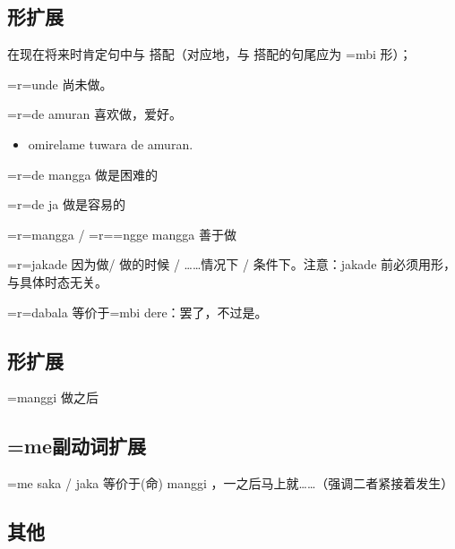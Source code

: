\subsection{形扩展}

在现在将来时肯定句中与  搭配（对应地，与  搭配的句尾应为 =mbi 形）；

\begin{des}
    \item[\V=r=\AIfina unde] 尚未做。
    \item[\V=r=\AIfina de amuran] 喜欢做\V ，爱好。
    \begin{itemize}
        \item {}  omirelame  tuwara de amuran.
    \end{itemize} 
    \item[\V=r=\AIfina de mangga] 做\V 是困难的
    \item[\V=r=\AIfina de ja]做\V 是容易的
    \item[\V=r=\AIfina mangga / \V=r=\AImedi=ngge mangga] 善于做\V  
    \item[\V=r=\AIfina jakade] 因为做\V / 做\V 的时候 / ……情况下 / 条件下。注意：jakade 前必须用形，与具体时态无关。
    \item[\V=r=\AIfina dabala] 等价于\V=mbi dere：罢了，不过是。 
\end{des}

\subsection{形扩展}

\begin{des}
    \item[\V=\HA manggi] 做\V 之后
\end{des}

\subsection{=me副动词扩展}

\begin{des}
    \item[\V=me saka / jaka] 等价于\V (命) manggi ，一\V 之后马上就……（强调二者紧接着发生）
\end{des}

\subsection{其他}

